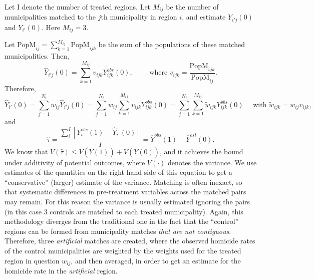 \documentclass{article}[11 pt]
\begin{document}
Let I denote the number of treated regions. Let $M_{ij}$ be the number of municipalities matched to the $j$th municipality in region $i$, and estimate $Y_{i'j}(0)$ and $Y_{i'}(0)$. Here $M_{ij}=3$.

      Let $\textrm{PopM}_{ij}=\sum_{k=1}^{M_{ij}}\textrm{PopM}_{ijk}$ be the sum of the populations of these matched municipalities. %
 Then,
      $$\hat{Y}_{i'j}(0) =\sum_{k=1}^{M_{ij}}v_{ijk}Y^{obs}_{ijk}(0),\quad \quad \textrm{ where } v_{ijk}=\frac{\textrm{PopM}_{ijk}}{\textrm{PopM}_{ij}}.$$
      Therefore,
      $$\hat{Y}_{i'}(0) =\sum_{j=1}^{N_i}w_{ij}\hat{Y}_{i'j}(0) =\sum_{j=1}^{N_i}w_{ij}\sum_{k=1}^{M_{ij}}v_{ijk}Y^{obs}_{ijk}(0) =
      \sum_{j=1}^{N_i}\sum_{k=1}^{M_{ij}}\tilde{w}_{ijk}Y^{obs}_{ijk}(0) \quad \textrm{ with } \tilde{w}_{ijk} = w_{ij}v_{ijk}, $$
      and
      $$\hat{\tau}=\frac{\sum_i^{I}[Y^{obs}_i(1) - \hat{Y}_{i'}(0)]}{I}=\overline{Y}^{obs}(1)-\overline{Y}^{est}(0).$$
      We know that $V(\hat{\tau})\leq V(\overline{Y}(1))+V(\overline{Y}(0))$, %
and it achieves the bound under additivity of potential outcomes, where $V(\cdot)$ denotes the variance. We use estimates of the quantities on the right hand side of this equation to get a ``conservative'' (larger) estimate of the variance. Matching is often inexact, so that systematic differences in pre-treatment variables across the matched pairs may remain. For this reason the variance is usually estimated ignoring the pairs (in this case 3 controls are matched to each treated municipality). Again, this methodology diverges from the traditional one in the fact that the ``control'' regions can be formed from municipality matches \emph{that are not contiguous}. Therefore, three \emph{artificial} matches are created, where the observed homicide rates of the control municipalities are weighted by the weights used for the treated region in question $w_{ij}$, and then averaged, in order to get an estimate for the homicide rate in the \emph{artificial} region. 

\end{document}
